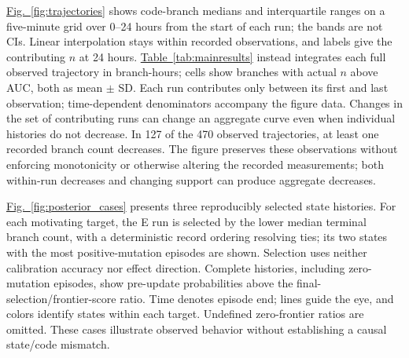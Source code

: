 \documentclass[final,5p,times,number]{elsarticle}
\newcommand{\namedref}[2]{\hyperref[#2]{#1~\ref*{#2}}}
\newcommand{\figref}[1]{\namedref{Fig.}{#1}}
\begin{document}
\figref{fig:trajectories} shows code-branch medians and interquartile ranges on a five-minute grid over 0--24 hours from the start of each run; the bands are not CIs. Linear interpolation stays within recorded observations, and labels give the contributing $n$ at 24 hours. \namedref{Table}{tab:mainresults} instead integrates each full observed trajectory in branch-hours; cells show branches with actual $n$ above AUC, both as mean $\pm$ SD. Each run contributes only between its first and last observation; time-dependent denominators accompany the figure data. Changes in the set of contributing runs can change an aggregate curve even when individual histories do not decrease. In 127 of the 470 observed trajectories, at least one recorded branch count decreases. The figure preserves these observations without enforcing monotonicity or otherwise altering the recorded measurements; both within-run decreases and changing support can produce aggregate decreases.

\figref{fig:posterior_cases} presents three reproducibly selected state histories. For each motivating target, the E run is selected by the lower median terminal branch count, with a deterministic record ordering resolving ties; its two states with the most positive-mutation episodes are shown. Selection uses neither calibration accuracy nor effect direction. Complete histories, including zero-mutation episodes, show pre-update probabilities above the final-selection/frontier-score ratio. Time denotes episode end; lines guide the eye, and colors identify states within each target. Undefined zero-frontier ratios are omitted. These cases illustrate observed behavior without establishing a causal state/code mismatch.
\end{document}
